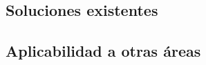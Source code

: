\subsection{Soluciones existentes}
\label{sec:existentes}


%


\subsection{Aplicabilidad a otras áreas}





